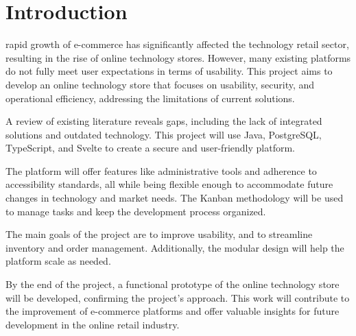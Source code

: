 \documentclass[a4paper,journal]{IEEEtran}
\begin{document}
\section{Introduction}
%
%
%
%
rapid growth of e-commerce has significantly affected the technology retail
sector, resulting in the rise of online technology stores.
However, many existing platforms do not fully meet user expectations in terms of
usability.
This project aims to develop an online technology store that focuses on
usability, security, and operational efficiency, addressing the limitations of
current solutions.

A review of
existing literature reveals gaps, including the lack of integrated solutions and
outdated technology.
This project will use Java, PostgreSQL, TypeScript, and Svelte
to create a secure and user-friendly platform.

The platform will offer features like
administrative tools and adherence to accessibility standards, all while being
flexible enough to accommodate future changes in technology and market needs.
The Kanban methodology will be used to manage tasks and keep the development
process organized.

The main goals of the project are to improve usability, and
to streamline inventory and order management.
Additionally, the modular design will help the platform scale as needed.

By the end of the project, a functional prototype of the online technology store
will be developed, confirming the project's approach. This work will contribute
to the improvement of e-commerce platforms and offer valuable insights for
future development in the online retail industry.

\end{document}
